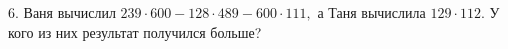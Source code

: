 6. Ваня вычислил $239\cdot600-128\cdot489-600\cdot111,$ а Таня вычислила $129\cdot112.$ У кого из них результат получился больше?\\
